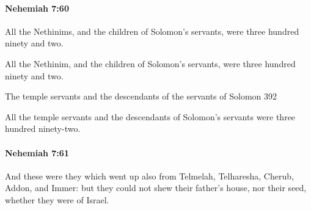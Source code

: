 		\paragraph{Nehemiah 7:60} %
			\label{NEHEMIAH-7-60}

			All the Nethinims, and the children of Solomon’s servants, were three hundred ninety and two.

			\begin{versebox}
					\item[BHS] 
					\item[LXX] 
					\item[ASV] All the Nethinim, and the children of Solomon's servants, were three hundred ninety and two.
					\item[NIV] The temple servants and the descendants of the servants of Solomon 392
					\item[NRSV] All the temple servants and the descendants of Solomon’s servants were three hundred ninety-two.
			\end{versebox}

		\paragraph{Nehemiah 7:61} %
			\label{NEHEMIAH-7-61}

			And these were they which went up also from Telmelah, Telharesha, Cherub, Addon, and Immer: but they could not shew their father’s house, nor their seed, whether they were of Israel.

